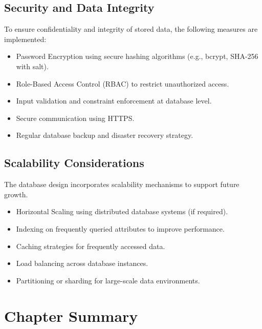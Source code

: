 \subsection{Security and Data Integrity}

To ensure confidentiality and integrity of stored data, the following measures are implemented:

\begin{itemize}
    \item Password Encryption using secure hashing algorithms (e.g., bcrypt, SHA-256 with salt).
    \item Role-Based Access Control (RBAC) to restrict unauthorized access.
    \item Input validation and constraint enforcement at database level.
    \item Secure communication using HTTPS.
    \item Regular database backup and disaster recovery strategy.
\end{itemize}



\subsection{Scalability Considerations}

The database design incorporates scalability mechanisms to support future growth.

\begin{itemize}
    \item Horizontal Scaling using distributed database systems (if required).
    \item Indexing on frequently queried attributes to improve performance.
    \item Caching strategies for frequently accessed data.
    \item Load balancing across database instances.
    \item Partitioning or sharding for large-scale data environments.
\end{itemize}


\section{Chapter Summary}

